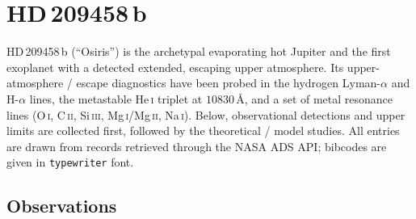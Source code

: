 \section{HD\,209458\,b}
\label{sec:hd209458b}

HD\,209458\,b (``Osiris'') is the archetypal evaporating hot Jupiter and the
first exoplanet with a detected extended, escaping upper atmosphere. Its
upper-atmosphere / escape diagnostics have been probed in the hydrogen
Lyman-$\alpha$ and H-$\alpha$ lines, the metastable He\,\textsc{i} triplet at
$10830$\,\AA, and a set of metal resonance lines (O\,\textsc{i}, C\,\textsc{ii},
Si\,\textsc{iii}, Mg\,\textsc{i}/Mg\,\textsc{ii}, Na\,\textsc{i}). Below,
observational detections and upper limits are collected first, followed by the
theoretical / model studies. All entries are drawn from records retrieved
through the NASA ADS API; bibcodes are given in \texttt{typewriter} font.

\subsection{Observations}

